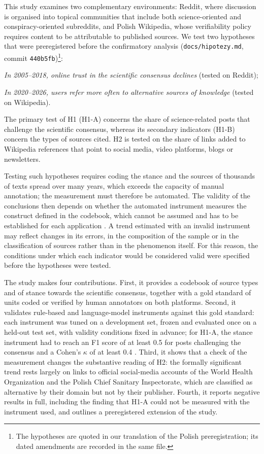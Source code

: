 \documentclass[10pt,a4paper]{article}
\newcommand{\kod}[1]{\texttt{#1}}
\begin{document}
This study examines two complementary environments: Reddit, where discussion is organised
into topical communities that include both science-oriented and conspiracy-oriented
subreddits, and Polish Wikipedia, whose verifiability policy requires content to be
attributable to published sources. We test two hypotheses that were preregistered before
the confirmatory analysis (\kod{docs/hipotezy.md}, commit
\kod{440b5fb})\footnote{The hypotheses are quoted in our translation of the Polish
preregistration; its dated amendments are recorded in the same file.}:
\begin{description}\setlength\itemsep{0pt}
\item[H1:] \emph{In 2005--2018, online trust in the scientific consensus declines}
  (tested on Reddit);
\item[H2:] \emph{In 2020--2026, users refer more often to alternative sources of
  knowledge} (tested on Wikipedia).
\end{description}
The primary test of H1 (H1-A) concerns the share of science-related posts that challenge
the scientific consensus, whereas its secondary indicators (H1-B) concern the types of
sources cited. H2 is tested on the share of links added to Wikipedia references that
point to social media, video platforms, blogs or newsletters.

Testing such hypotheses requires coding the stance and the sources of thousands of texts
spread over many years, which exceeds the capacity of manual annotation; the measurement
must therefore be automated. The validity of the conclusions then depends on whether the
automated instrument measures the construct defined in the codebook, which cannot be
assumed and has to be established for each application \cite{grimmer2013}. A trend
estimated with an invalid instrument may reflect changes in its errors, in the
composition of the sample or in the classification of sources rather than in the
phenomenon itself. For this reason, the conditions under which each indicator would be
considered valid were specified before the hypotheses were tested.

The study makes four contributions. First, it provides a codebook of source types and of
stance towards the scientific consensus, together with a gold standard of units coded or
verified by human annotators on both platforms. Second, it validates rule-based and
language-model instruments against this gold standard: each instrument was tuned on a
development set, frozen and evaluated once on a held-out test set, with validity
conditions fixed in advance; for H1-A, the stance instrument had to reach an F1 score of
at least 0.5 for posts challenging the consensus and a Cohen's $\kappa$ of at least 0.4
\cite{cohen1960}. Third, it shows that a check of the measurement changes the substantive
reading of H2: the formally significant trend rests largely on links to official
social-media accounts of the World Health Organization and the Polish Chief Sanitary
Inspectorate, which are classified as alternative by their domain but not by their
publisher. Fourth, it reports negative results in full, including the finding that H1-A
could not be measured with the instrument used, and outlines a preregistered extension of
the study.
\end{document}
